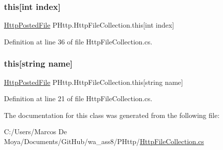 \subsubsection{\texorpdfstring{this[int index]}{this[int index]}}
{\footnotesize\ttfamily \hyperlink{class_p_http_1_1_http_posted_file}{Http\+Posted\+File} P\+Http.\+Http\+File\+Collection.\+this\mbox{[}int index\mbox{]}\hspace{0.3cm}{\ttfamily [get]}}



Definition at line 36 of file Http\+File\+Collection.\+cs.

\mbox{\label{class_p_http_1_1_http_file_collection_a1a9cd2818bd2ff42842d291245f53ceb}} 
\subsubsection{\texorpdfstring{this[string name]}{this[string name]}}
{\footnotesize\ttfamily \hyperlink{class_p_http_1_1_http_posted_file}{Http\+Posted\+File} P\+Http.\+Http\+File\+Collection.\+this\mbox{[}string name\mbox{]}\hspace{0.3cm}{\ttfamily [get]}}



Definition at line 21 of file Http\+File\+Collection.\+cs.



The documentation for this class was generated from the following file\+:\begin{DoxyCompactItemize}
\item 
C\+:/\+Users/\+Marcos De Moya/\+Documents/\+Git\+Hub/wa\+\_\+ass8/\+P\+Http/\hyperlink{_http_file_collection_8cs}{Http\+File\+Collection.\+cs}\end{DoxyCompactItemize}
